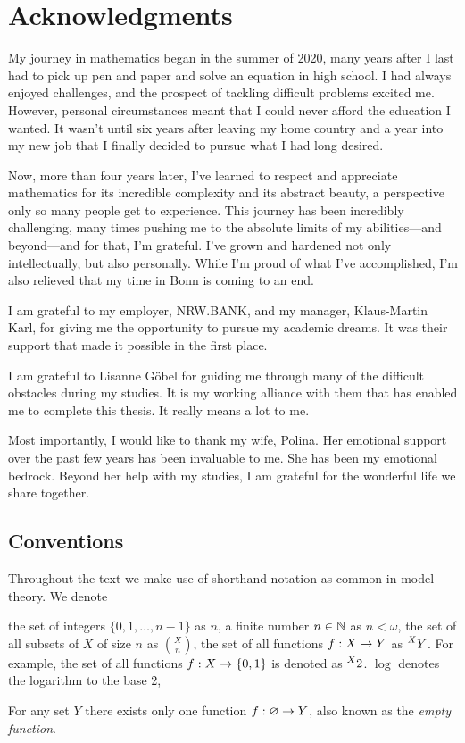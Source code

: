 \section*{Acknowledgments}
My journey in mathematics began in the summer of 2020, many years after I last had to pick up pen and paper and solve an equation in high school. I had always enjoyed challenges, and the prospect of tackling difficult problems excited me. However, personal circumstances meant that I could never afford the education I wanted. It wasn't until six years after leaving my home country and a year into my new job that I finally decided to pursue what I had long desired. 

Now, more than four years later, I've learned to respect and appreciate mathematics for its incredible complexity and its abstract beauty, a perspective only so many people get to experience. This journey has been incredibly challenging, many times pushing me to the absolute limits of my abilities---and beyond---and for that, I'm grateful. I've grown and hardened not only intellectually, but also personally. While I'm proud of what I've accomplished, I'm also relieved that my time in Bonn is coming to an end. 

I am grateful to my employer, NRW.BANK, and my manager, Klaus-Martin Karl, for giving me the opportunity to pursue my academic dreams. It was their support that made it possible in the first place. 

I am grateful to Lisanne Göbel for guiding me through many of the difficult obstacles during my studies. It is my working alliance with them that has enabled me to complete this thesis. It really means a lot to me. 

Most importantly, I would like to thank my wife, Polina. Her emotional support over the past few years has been invaluable to me. She has been my emotional bedrock. Beyond her help with my studies, I am grateful for the wonderful life we share together.

\newpage\phantom{blabla}\newpage

\setcounter{tocdepth}{3}
\tableofcontents


\subsection*{Conventions}
Throughout the text we make use of shorthand notation as common in model theory. We denote
\begin{outline}
    \1 the set of integers $\{0,1,\ldots,n-1\}$ as $n$, 
    \1 a finite number $n\in \mathbb{N}$ as $n<\omega$,
    \1 the set of all subsets of $X$ of size $n$ as $\binom{X}{n}$,
    \1 the set of all functions $f:X\rightarrow Y$ as $\prescript{X}{}{Y}$. 
    \0 For example, the set of all functions $f:X \rightarrow \{0,1\}$ is denoted as $\prescript{X}{}{2}$.
    \1 $\log$ denotes the logarithm to the base 2,
\end{outline}
For any set $Y$ there exists only one function $f:\varnothing\rightarrow Y$, also known as the \emph{empty function}.

